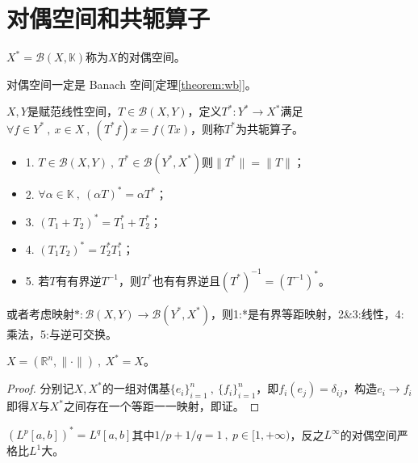 \section{对偶空间和共轭算子}\label{dual}
\begin{definition}[对偶空间]
$X^*=\mathscr{B}(X,\mathbb{K})$称为$X$的对偶空间。
\end{definition}
\begin{remark}
\quad 对偶空间一定是 Banach 空间[定理\ref{theorem:wb}]。
\end{remark}
\begin{definition}[共轭算子]
$X,Y$是赋范线性空间，$T \in \mathscr{B}(X,Y)$，定义$T^*:Y^* \to X^*$满足$\forall f \in Y^* \ , \ x \in X \ , \ (T^*f)x=f(Tx)$，则称$T^*$为共轭算子。
\end{definition}
\begin{lemma}
\begin{itemize}
\item 1. $T \in \mathscr{B}(X,Y) \ , \ T^* \in \mathscr{B}(Y^*,X^*)$则$\|T^*\|=\|T\|$；
\item 2. $\forall \alpha \in \mathbb{K} \ , \ (\alpha T)^*=\alpha T^*$；
\item 3. $(T_1+T_2)^*=T_1^*+T_2^*$；
\item 4. $(T_1T_2)^*=T_2^*T_1^*$；
\item 5. 若$T$有有界逆$T^{-1}$，则$T^*$也有有界逆且$(T^*)^{-1}=(T^{-1})^*$。
\end{itemize}
或者考虑映射$*:\mathscr{B}(X,Y) \to \mathscr{B}(Y^*,X^*)$，则1:*是有界等距映射，2\&3:线性，4:乘法，5:与逆可交换。
\end{lemma} 
\begin{example}
\quad $X=(\mathbb{R}^n,\|\cdot\|) \ , \ X^*=X$。
\end{example}
\begin{proof}
分别记$X,X^*$的一组对偶基$\{e_i\}_{i=1}^n \ , \ \{f_i\}_{i=1}^n$，即$f_i(e_j)=\delta_{ij}$，构造$e_i \to f_i$即得$X$与$X^*$之间存在一个等距一一映射，即证。
\end{proof}
\begin{example}\label{example:Lp}
\quad $(L^p[a,b])^*=L^q[a,b]$其中$1/p+1/q=1 \ , \ p \in [1,+\infty)$，反之$L^{\infty}$的对偶空间严格比$L^1$大。
\end{example}
